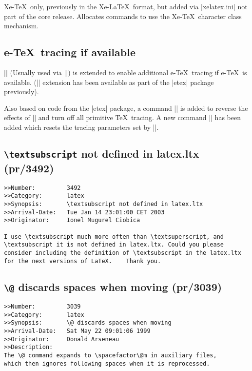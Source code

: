 \documentclass{ltxguide}
\newcommand\DescribeMacro[1]{\texttt{\string#1}}
\begin{document}
\DescribeMacro{\newXeTeXintercharclass}
\smallskip

Xe-\TeX\ only, previously in the Xe-\LaTeX\ format, but added via
|xelatex.ini| not part of the core release. 
Allocates commands to use the Xe-\TeX\ character class mechanism.


\subsection{e-\TeX\ tracing if available}
|\loggingall| (Usually used via |\tracingall|) is extended to enable
additional e-\TeX\ tracing if e-\TeX\ is available. (|\tracingall|
extension has been available as part of the |etex| package previously).

Also based on code from the |etex| package, a command |\tracingnone|
is added to reverse the effects of |\tracingall| and turn off all primitive
\TeX\ tracing. A new command |\hideoutput| has been  added which resets the
tracing parameters set by |\showoutput|.




\subsection{\texttt{\textbackslash textsubscript} not defined in
   latex.ltx (pr/3492)}

\begin{verbatim}
>>Number:         3492
>>Category:       latex
>>Synopsis:       \textsubscript not defined in latex.ltx
>>Arrival-Date:   Tue Jan 14 23:01:00 CET 2003
>>Originator:     Ionel Mugurel Ciobica

I use \textsubscript much more often than \textsuperscript, and
\textsubscript it is not defined in latex.ltx. Could you please
consider including the definition of \textsubscript in the latex.ltx
for the next versions of LaTeX.    Thank you.
\end{verbatim}

\subsection{\texttt{\textbackslash @} discards spaces when moving
            (pr/3039)}

\begin{verbatim}
>>Number:         3039
>>Category:       latex
>>Synopsis:       \@ discards spaces when moving
>>Arrival-Date:   Sat May 22 09:01:06 1999
>>Originator:     Donald Arseneau
>>Description:
The \@ command expands to \spacefactor\@m in auxiliary files,
which then ignores following spaces when it is reprocessed.
\end{verbatim}
\end{document}

